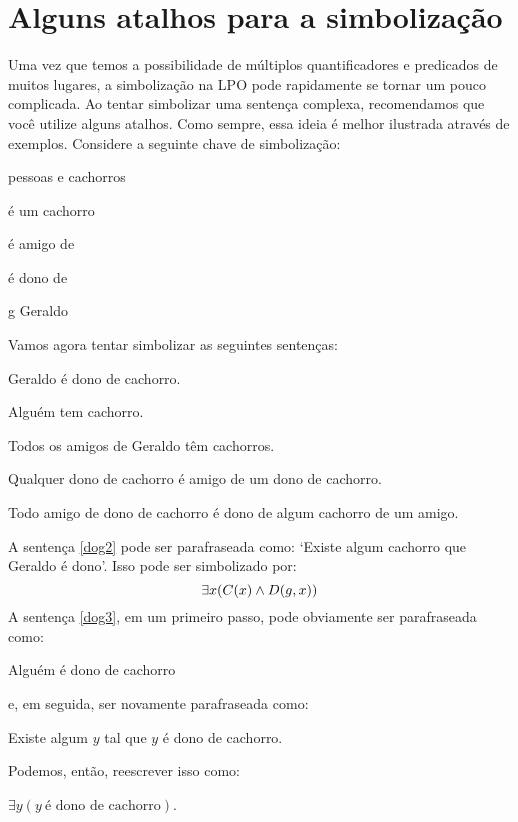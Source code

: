 \section{Alguns atalhos para a simbolização}\label{SecAtSimb}
Uma vez que temos a possibilidade de múltiplos quantificadores e predicados de muitos lugares, a simbolização na LPO pode rapidamente se tornar um pouco complicada.
Ao tentar simbolizar uma sentença complexa, recomendamos que você utilize alguns atalhos.
Como sempre, essa ideia é melhor ilustrada através de exemplos.
Considere a seguinte chave de simbolização:
\begin{center}
\begin{ekey}
\item[\text{domínio}] pessoas e cachorros
\item[\atom{C}{x}]  é um cachorro
\item[\atom{A}{x,y}]  é amigo de 
\item[\atom{D}{x,y}]  é dono de 
\item[g] Geraldo
\end{ekey}
\end{center}
Vamos agora tentar simbolizar as seguintes sentenças:
\begin{earg}
\item[\ex{dog2}] Geraldo é dono de cachorro.
\item[\ex{dog3}] Alguém tem cachorro.
\item[\ex{dog4}] Todos os amigos de Geraldo têm cachorros.
\item[\ex{dog5}] Qualquer dono de cachorro é amigo de um dono de cachorro.
\item[\ex{dog6}] Todo amigo de dono de cachorro é dono de algum cachorro de um amigo.
\end{earg}
A sentença \ref{dog2} pode ser parafraseada como: `Existe algum cachorro que Geraldo é dono'.
Isso pode ser simbolizado por:
$$\exists x(\mathord{C}(x) \wedge \mathord{D}(g,x))$$
A sentença \ref{dog3}, em um primeiro passo, pode obviamente ser parafraseada como:
\begin{center}
	Alguém é dono de cachorro
\end{center}
e, em seguida, ser novamente parafraseada como:
\begin{center}
	Existe algum $y$ tal que $y$ é dono de cachorro.
\end{center}
Podemos, então, reescrever isso como:
\begin{center}
	$\exists y(y\ \text{é dono de cachorro})$.
\end{center}
